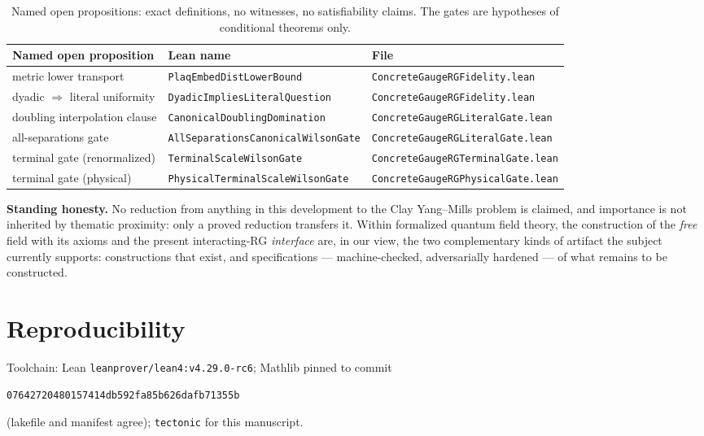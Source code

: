 \documentclass[11pt]{article}
\theoremstyle{definition}
\newcommand{\lean}[1]{\texttt{#1}}
\begin{document}
\begin{table}[ht]
\centering
\footnotesize
\begin{tabular}{@{}lll@{}}
\toprule
Named open proposition & Lean name & File \\
\midrule
metric lower transport & \lean{PlaqEmbedDistLowerBound} & \lean{ConcreteGaugeRGFidelity.lean} \\
dyadic $\Rightarrow$ literal uniformity & \lean{DyadicImpliesLiteralQuestion} & \lean{ConcreteGaugeRGFidelity.lean} \\
doubling interpolation clause & \lean{CanonicalDoublingDomination} & \lean{ConcreteGaugeRGLiteralGate.lean} \\
all-separations gate & \lean{AllSeparationsCanonicalWilsonGate} & \lean{ConcreteGaugeRGLiteralGate.lean} \\
terminal gate (renormalized) & \lean{TerminalScaleWilsonGate} & \lean{ConcreteGaugeRGTerminalGate.lean} \\
terminal gate (physical) & \lean{PhysicalTerminalScaleWilsonGate} & \lean{ConcreteGaugeRGPhysicalGate.lean} \\
\bottomrule
\end{tabular}
\caption{Named open propositions: exact definitions, no witnesses, no
satisfiability claims.  The gates are hypotheses of conditional
theorems only.}\label{tab:open}
\end{table}

\medskip
\noindent\textbf{Standing honesty.}  No reduction from anything in
this development to the Clay Yang--Mills problem is claimed, and
importance is not inherited by thematic proximity: only a proved
reduction transfers it.  Within formalized quantum field theory, the
construction of the \emph{free} field with its axioms \cite{DHMN26}
and the present interacting-RG \emph{interface} are, in our view, the
two complementary kinds of artifact the subject currently supports:
constructions that exist, and specifications --- machine-checked,
adversarially hardened --- of what remains to be constructed.

\section{Reproducibility}\label{sec:repro}

Toolchain: Lean \lean{leanprover/lean4:v4.29.0-rc6}; Mathlib pinned to
commit
\begin{center}\small
\lean{07642720480157414db592fa85b626dafb71355b}
\end{center}
\noindent (lakefile and manifest agree); \lean{tectonic} for this
manuscript.
\end{document}
